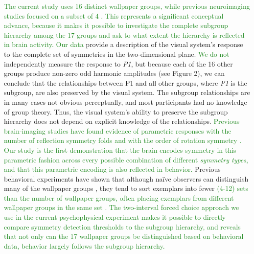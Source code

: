 \documentclass[11pt, twoside]{article}
\begin{document}
\textcolor{ForestGreen}{The current study uses 16 distinct wallpaper groups, while previous neuroimaging studies focused on a subset of 4 \citep{RN1725,RN1959}. This represents a significant conceptual advance, because it makes it possible to investigate the complete subgroup hierarchy among the 17 groups and ask to what extent the hierarchy is reflected in brain activity. Our data} provide a description of the visual system’s response to the complete set of symmetries in the two-dimensional plane. 
\textcolor{ForestGreen}{We do not} independently measure the response to \textit{P1}, but because each of the 16 other groups produce non-zero odd harmonic amplitudes (see Figure 2), we can conclude that the relationships between P1 and all other groups, where \textit{P1} is the subgroup, are also preserved by the visual system. The subgroup relationships are in many cases not obvious perceptually, and most participants had no knowledge of group theory. Thus, the visual system’s ability to preserve the subgroup hierarchy does not depend on explicit knowledge of the relationships. \textcolor{ForestGreen}{Previous brain-imaging studies have found evidence of parametric responses with the number of reflection symmetry folds \cite{keefe_2018, Sasaki_2005, makin_2016} and with the order of rotation symmetry \cite{RN1725}. Our study is the first demonstration that the brain encodes symmetry in this parametric fashion across every possible combination of different \textit{symmetry types}, and that this parametric encoding is also reflected in behavior.} Previous behavioral experiments have shown that although naïve observers can distinguish many of the wallpaper groups \citep{RN1253}, they tend to sort exemplars into fewer \textcolor{ForestGreen}{(4-12) sets than the number of wallpaper groups, often placing exemplars from different wallpaper groups in the same set \citep{RN172}. The two-interval forced choice approach we use in the current psychophysical experiment makes it possible to directly compare symmetry detection thresholds to the subgroup hierarchy, and reveals that not only can the 17 wallpaper groups be distinguished based on behavioral data, behavior largely follows the subgroup hierarchy.}  
\end{document}
